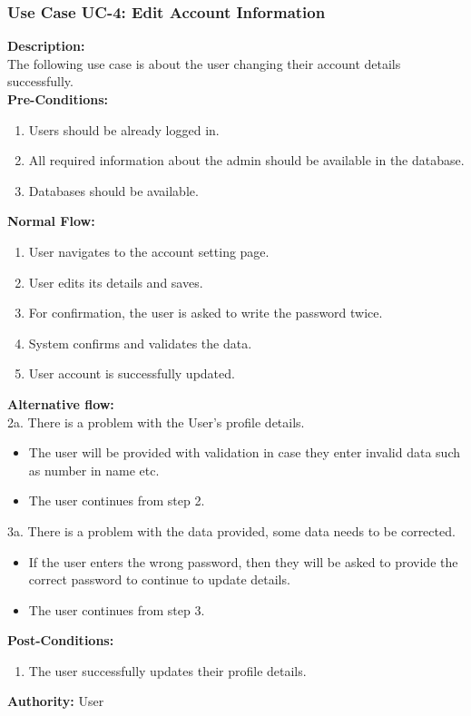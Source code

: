\subsubsection{Use Case UC-4: Edit Account Information}
\textbf{Description:}\\
The following use case is about the user changing their account details successfully. 
\\
\textbf{Pre-Conditions:}
\begin{enumerate}
    \item Users should be already logged in.
    \item  All required information about the admin should be available in the database.
    \item Databases should be available.
\end{enumerate}
\textbf{Normal Flow:}\\
\begin{enumerate}
\item User navigates to the account setting page. 
\item User edits its details and saves. 
\item For confirmation, the user is asked to write the password twice.
\item System confirms and validates the data.
\item User account is successfully updated. 
\end{enumerate}
\textbf{Alternative flow:}\\ 
2a. There is a problem with the User’s profile details.
\begin{itemize}
    \item The user will be provided with validation in case they enter invalid data such as number in name etc. 
    \item The user continues from step 2.
\end{itemize}
3a. There is a problem with the data provided, some data needs to be corrected. 
\begin{itemize}
    \item If the user enters the wrong password, then they will be asked to provide the correct password to continue to update details. 
    \item The user continues from step 3.
\end{itemize}
\textbf{Post-Conditions: }
\begin{enumerate}
\item	The user successfully updates their profile details.
\end{enumerate}
\textbf{Authority:}
User
